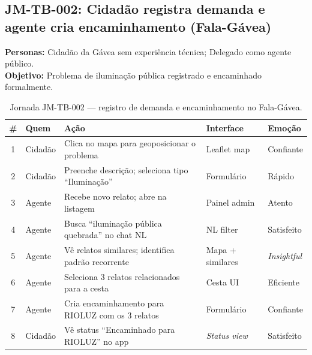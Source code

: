 \documentclass[12pt,a4paper]{article}
\begin{document}
\subsection{JM-TB-002: Cidadão registra demanda e agente cria encaminhamento (Fala-Gávea)}

\textbf{Personas:} Cidadão da Gávea sem experiência técnica; Delegado como agente público.\\
\textbf{Objetivo:} Problema de iluminação pública registrado e encaminhado formalmente.

\begin{table}[h!]
\centering
\small
\begin{tabular}{cllll}
\toprule
\textbf{\#} & \textbf{Quem} & \textbf{Ação} & \textbf{Interface} & \textbf{Emoção} \\
\midrule
1 & Cidadão & Clica no mapa para geoposicionar o problema & Leaflet map & Confiante \\
2 & Cidadão & Preenche descrição; seleciona tipo ``Iluminação'' & Formulário & Rápido \\
3 & Agente & Recebe novo relato; abre na listagem & Painel admin & Atento \\
4 & Agente & Busca ``iluminação pública quebrada'' no chat NL & NL filter & Satisfeito \\
5 & Agente & Vê relatos similares; identifica padrão recorrente & Mapa + similares & \textit{Insightful} \\
6 & Agente & Seleciona 3 relatos relacionados para a cesta & Cesta UI & Eficiente \\
7 & Agente & Cria encaminhamento para RIOLUZ com os 3 relatos & Formulário & Confiante \\
8 & Cidadão & Vê status ``Encaminhado para RIOLUZ'' no app & \textit{Status view} & Satisfeito \\
\bottomrule
\end{tabular}
\caption{Jornada JM-TB-002 — registro de demanda e encaminhamento no Fala-Gávea.}
\end{table}
\end{document}
